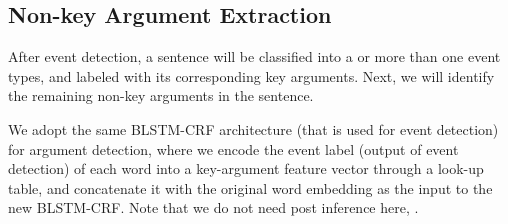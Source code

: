 \subsection{Non-key Argument Extraction}
After event detection, a sentence will be classified into a or more than one event types, and labeled with its corresponding key arguments.
Next, we will identify the remaining non-key arguments in the sentence.

We adopt the same BLSTM-CRF architecture (that is used for event detection) for argument detection, where we encode the event label (output
of event detection) of each word into a key-argument feature vector through a look-up table, and concatenate it with the original word
embedding as the input to the new BLSTM-CRF. Note that we do not need post inference here, .
